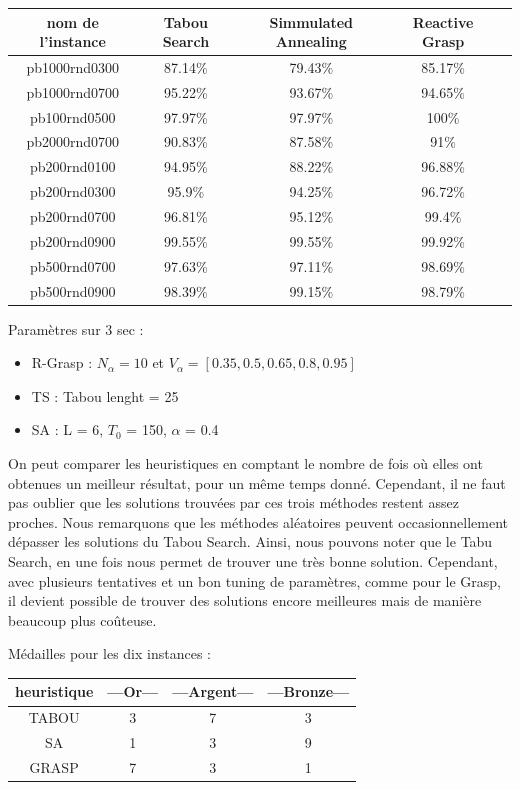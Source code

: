 \begin{center}
    \begin{tabular}{|c|c|c|c|c|}  
    \hline
    nom de l'instance &  Tabou Search & Simmulated Annealing & Reactive Grasp\\
     \hline
     pb1000rnd0300 & 87.14\% & 79.43\% & 85.17\% \\
     \hline
     pb1000rnd0700 & 95.22\% & 93.67\% & 94.65\% \\
     \hline
     pb100rnd0500 & 97.97\% & 97.97\% & 100\% \\
     \hline
     pb2000rnd0700 & 90.83\% & 87.58\% & 91\% \\
     \hline
     pb200rnd0100 & 94.95\% & 88.22\% & 96.88\% \\
     \hline
     pb200rnd0300 & 95.9\% & 94.25\% & 96.72\% \\
     \hline
     pb200rnd0700 & 96.81\% & 95.12\% & 99.4\% \\
     \hline
     pb200rnd0900 & 99.55\% & 99.55\% & 99.92\% \\
     \hline 
     pb500rnd0700 & 97.63\% & 97.11\% & 98.69\% \\
     \hline 
     pb500rnd0900 & 98.39\% & 99.15\% & 98.79\% \\
     \hline
    \end{tabular}
\end{center}

Paramètres sur 3 sec :
\begin{itemize}
\item R-Grasp : $N_{\alpha} = 10$ et $V_{\alpha} = [0.35,0.5,0.65,0.8,0.95]$
\item TS : Tabou lenght = 25
\item SA : L = 6, $T_0$ = 150, $\alpha$ = 0.4
\end{itemize}

On peut comparer les heuristiques en comptant le nombre de fois où elles ont obtenues un meilleur résultat, pour un même temps donné. Cependant, il ne faut pas oublier que les solutions trouvées par ces trois méthodes restent assez proches. Nous remarquons que les méthodes aléatoires peuvent occasionnellement dépasser les solutions du Tabou Search. Ainsi, nous pouvons noter que le Tabu Search, en une fois nous permet de trouver une très bonne solution. Cependant, avec plusieurs tentatives et un bon tuning de paramètres, comme pour le Grasp, il devient possible de trouver des solutions encore meilleures mais de manière beaucoup plus coûteuse. 
\begin{center}
  Médailles pour les dix instances : \\
    \begin{tabular}{|c|c|c|c|}  
    \hline
    heuristique & ---Or--- & ---Argent--- & ---Bronze---\\
    \hline
    TABOU & 3 & 7 & 3 \\
    \hline
    SA    & 1 & 3 & 9\\
    \hline
    GRASP & 7 & 3 & 1\\
    \hline
    \end{tabular}
\end{center}

